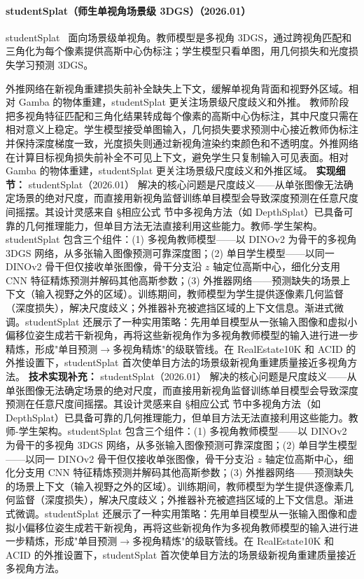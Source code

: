 \paragraph{studentSplat（师生单视角场景级 3DGS）（2026.01）}
studentSplat~\cite{2601_11772} 面向场景级单视角。教师模型是多视角 3DGS，通过跨视角匹配和三角化为每个像素提供高斯中心伪标注；学生模型只看单图，用几何损失和光度损失学习预测 3DGS。

外推网络在新视角重建损失前补全缺失上下文，缓解单视角背面和视野外区域。相对 Gamba 的物体重建，studentSplat 更关注场景级尺度歧义和外推。
教师阶段把多视角特征匹配和三角化结果转成每个像素的高斯中心伪标注，其中尺度只需在相对意义上稳定。学生模型接受单图输入，几何损失要求预测中心接近教师伪标注并保持深度梯度一致，光度损失则通过新视角渲染约束颜色和不透明度。外推网络在计算目标视角损失前补全不可见上下文，避免学生只复制输入可见表面。相对 Gamba 的物体重建，studentSplat 更关注场景级尺度歧义和外推区域。
\textbf{实现细节：} studentSplat（2026.01） 解决的核心问题是尺度歧义——从单张图像无法确定场景的绝对尺度，而直接用新视角监督训练单目模型会导致深度预测在任意尺度间摇摆。其设计灵感来自 §相应公式 节中多视角方法（如 DepthSplat）已具备可靠的几何推理能力，但单目方法无法直接利用这些能力。教师-学生架构。studentSplat 包含三个组件：(1) 多视角教师模型——以 DINOv2 为骨干的多视角 3DGS 网络，从多张输入图像预测可靠深度图；(2) 单目学生模型——以同一 DINOv2 骨干但仅接收单张图像，骨干分支沿 $z$ 轴定位高斯中心，细化分支用 CNN 特征精炼预测并解码其他高斯参数；(3) 外推器网络——预测缺失的场景上下文（输入视野之外的区域）。训练期间，教师模型为学生提供逐像素几何监督（深度损失），解决尺度歧义；外推器补充被遮挡区域的上下文信息。渐进式微调。studentSplat 还展示了一种实用策略：先用单目模型从一张输入图像和虚拟小偏移位姿生成若干新视角，再将这些新视角作为多视角教师模型的输入进行进一步精炼，形成"单目预测$\to$多视角精炼"的级联管线。在 RealEstate10K 和 ACID 的外推设置下，studentSplat 首次使单目方法的场景级新视角重建质量接近多视角方法。
\textbf{技术实现补充：} studentSplat（2026.01） 解决的核心问题是尺度歧义——从单张图像无法确定场景的绝对尺度，而直接用新视角监督训练单目模型会导致深度预测在任意尺度间摇摆。其设计灵感来自 §相应公式 节中多视角方法（如 DepthSplat）已具备可靠的几何推理能力，但单目方法无法直接利用这些能力。教师-学生架构。studentSplat 包含三个组件：(1) 多视角教师模型——以 DINOv2 为骨干的多视角 3DGS 网络，从多张输入图像预测可靠深度图；(2) 单目学生模型——以同一 DINOv2 骨干但仅接收单张图像，骨干分支沿 $z$ 轴定位高斯中心，细化分支用 CNN 特征精炼预测并解码其他高斯参数；(3) 外推器网络——预测缺失的场景上下文（输入视野之外的区域）。训练期间，教师模型为学生提供逐像素几何监督（深度损失），解决尺度歧义；外推器补充被遮挡区域的上下文信息。渐进式微调。studentSplat 还展示了一种实用策略：先用单目模型从一张输入图像和虚拟小偏移位姿生成若干新视角，再将这些新视角作为多视角教师模型的输入进行进一步精炼，形成"单目预测$\to$多视角精炼"的级联管线。在 RealEstate10K 和 ACID 的外推设置下，studentSplat 首次使单目方法的场景级新视角重建质量接近多视角方法。
